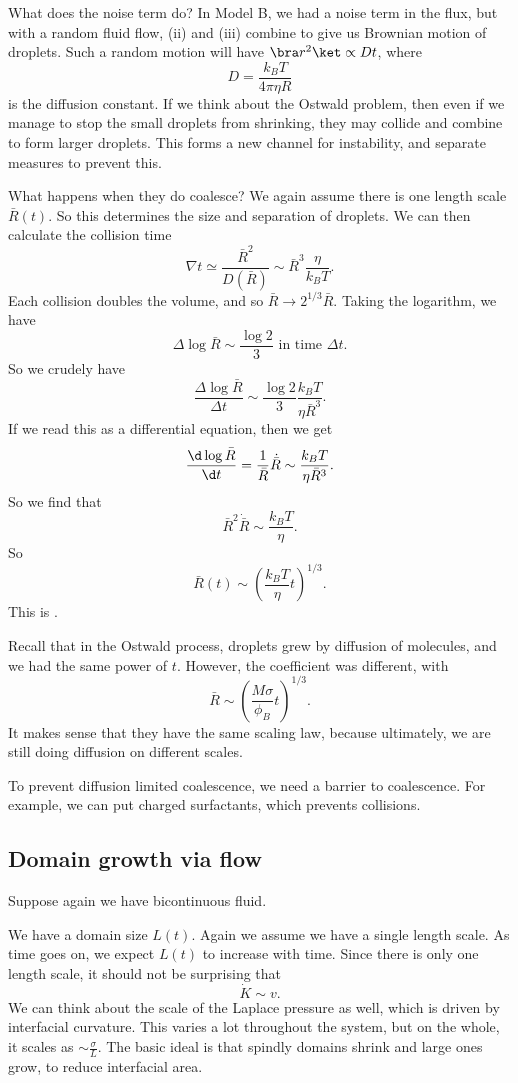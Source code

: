 \documentclass[a4paper]{article}
\begin{document}
What does the noise term do? In Model B, we had a noise term in the flux, but with a random fluid flow, (ii) and (iii) combine to give us Brownian motion of droplets. Such a random motion will have $\bra r^2\ket \propto Dt$, where
\[
  D = \frac{k_B T}{4\pi \eta R}
\]
is the diffusion constant. If we think about the Ostwald problem, then even if we manage to stop the small droplets from shrinking, they may collide and combine to form larger droplets. This forms a new channel for instability, and separate measures to prevent this.

What happens when they do coalesce? We again assume there is one length scale $\bar{R}(t)$. So this determines the size and separation of droplets. We can then calculate the collision time
\[
  \nabla t \simeq \frac{\bar{R}^2}{D(\bar{R})} \sim \bar{R}^3  \frac{\eta}{k_B T}.
\]
Each collision doubles the volume, and so $\bar{R} \to 2^{1/3} \bar{R}$. Taking the logarithm, we have
\[
  \Delta \log \bar{R} \sim \frac{\log 2}{3}\text{ in time }\Delta t.
\]
So we crudely have
\[
  \frac{\Delta \log \bar{R}}{\Delta t} \sim \frac{\log 2}{3} \frac{k_B T}{\eta \bar{R}^3}.
\]
If we read this as a differential equation, then we get
\[
  \frac{\d \log \bar{R}}{\d t} = \frac{1}{\bar{R}} \dot{\bar{R}} \sim \frac{k_B T}{\eta \bar{R}^3}.
\]
So we find that
\[
  \bar{R}^2 \dot{\bar{R}} \sim \frac{k_B T}{\eta}.
\]
So
\[
  \bar{R}(t) \sim \left(\frac{k_B T}{\eta} t\right)^{1/3}.
\]
This is .

Recall that in the Ostwald process, droplets grew by diffusion of molecules, and we had the same power of $t$. However, the coefficient was different, with
\[
  \bar{R} \sim \left(\frac{M \sigma}{\phi_B} t\right)^{1/3}.
\]
It makes sense that they have the same scaling law, because ultimately, we are still doing diffusion on different scales.

To prevent diffusion limited coalescence, we need a barrier to coalescence. For example, we can put charged surfactants, which prevents collisions.

\subsection{Domain growth via flow}
Suppose again we have bicontinuous fluid.

We have a domain size $L(t)$. Again we assume we have a single length scale. As time goes on, we expect $L(t)$ to increase with time. Since there is only one length scale, it should not be surprising that
\[
  \dot{K} \sim v.
\]
We can think about the scale of the Laplace pressure as well, which is driven by interfacial curvature. This varies a lot throughout the system, but on the whole, it scales as $\sim \frac{\sigma}{L}$. The basic ideal is that spindly domains shrink and large ones grow, to reduce interfacial area.


\printindex
\end{document}
